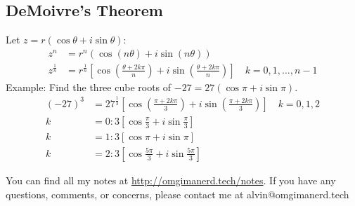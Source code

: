\documentclass{math}
\begin{document}
\subsection*{DeMoivre's Theorem}
Let \( z = r(\cos\theta+i\sin\theta) \):
\begin{align*}
  z^n &= r^n(\cos(n\theta)+i\sin(n\theta)) \\
  z^{\frac{1}{n}} &= r^{\frac{1}{n}}\left[
    \cos\left(\frac{\theta+2k\pi}{n}\right)+
    i\sin\left(\frac{\theta+2k\pi}{n}\right)\right] \quad k = 0,1,\dots,n-1
\end{align*}
Example: Find the three cube roots of \( -27 = 27(\cos\pi+i\sin\pi) \).
\begin{align*}
  (-27)^3 &= 27^{\frac{1}{3}}\left[\cos\left(\frac{\pi+2k\pi}{3}\right)+
    i\sin\left(\frac{\pi+2k\pi}{3}\right)\right] \quad k = 0,1,2 \\
  k &= 0: 3\left[\cos\frac{\pi}{3}+i\sin\frac{\pi}{3}\right] \\
  k &= 1: 3\left[\cos\pi+i\sin\pi\right] \\
  k &= 2: 3\left[\cos\frac{5\pi}{3}+i\sin\frac{5\pi}{3}\right]
\end{align*}

\begin{center}
  You can find all my notes at \url{http://omgimanerd.tech/notes}. If you have
  any questions, comments, or concerns, please contact me at
  alvin@omgimanerd.tech
\end{center}
\end{document}
